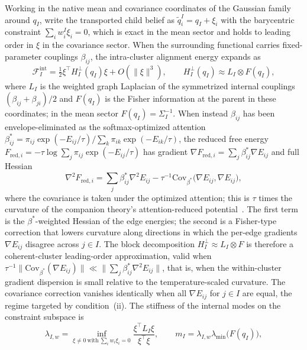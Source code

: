 \documentclass[11pt]{article}
\begin{document}
Working in the native mean and covariance coordinates of the Gaussian family around $q_I$, write the transported child belief as $\widetilde{q}_i^I = q_I + \xi_i$ with the barycentric constraint $\sum_i w_i^I \xi_i = 0$, which is exact in the mean sector and holds to leading order in $\xi$ in the covariance sector. When the surrounding functional carries fixed-parameter couplings $\beta_{ij}$, the intra-cluster alignment energy expands as
\begin{equation}
\mathcal{F}_I^{\mathrm{int}} = \tfrac{1}{2}\xi^\top H_I^\perp(q_I)\xi + O(\|\xi\|^3), \qquad H_I^\perp(q_I) \approx L_I \otimes F(q_I),
\label{eq:rg_internal_hessian}
\end{equation}
where $L_I$ is the weighted graph Laplacian of the symmetrized internal couplings $(\beta_{ij} + \beta_{ji})/2$ and $F(q_I)$ is the Fisher information at the parent in these coordinates; in the mean sector $F(q_I)=\Sigma_I^{-1}$. When instead $\beta_{ij}$ has been envelope-eliminated as the softmax-optimized attention $\beta^*_{ij} = \pi_{ij} \exp(-E_{ij}/\tau) / \sum_k \pi_{ik} \exp(-E_{ik}/\tau)$, the reduced free energy $F_{\mathrm{red},i} = -\tau \log \sum_j \pi_{ij} \exp(-E_{ij}/\tau)$ has gradient $\nabla F_{\mathrm{red},i} = \sum_j \beta^*_{ij} \nabla E_{ij}$ and full Hessian
\begin{equation}
\nabla^2 F_{\mathrm{red},i} = \sum_j \beta^*_{ij} \nabla^2 E_{ij} - \tau^{-1} \mathrm{Cov}_{\beta^*}\big(\nabla E_{ij}, \nabla E_{ij}\big),
\label{eq:rg_reduced_hessian}
\end{equation}
where the covariance is taken under the optimized attention; this is $\tau$ times the curvature of the companion theory's attention-reduced potential~\cite[Ch.~6]{DennisGaugeVFE2026}. The first term is the $\beta^*$-weighted Hessian of the edge energies; the second is a Fisher-type correction that lowers curvature along directions in which the per-edge gradients $\nabla E_{ij}$ disagree across $j \in I$. The block decomposition $H_I^\perp \approx L_I \otimes F$ is therefore a coherent-cluster leading-order approximation, valid when $\tau^{-1}\|\mathrm{Cov}_{\beta^*}(\nabla E_{ij})\| \ll \|\sum_j \beta^*_{ij} \nabla^2 E_{ij}\|$, that is, when the within-cluster gradient dispersion is small relative to the temperature-scaled curvature. The covariance correction vanishes identically when all $\nabla E_{ij}$ for $j \in I$ are equal, the regime targeted by condition~(ii). The stiffness of the internal modes on the constraint subspace is
\begin{equation}
\lambda_{I,w} = \inf_{\xi \neq 0\ \text{with}\ \sum_i w_i \xi_i = 0} \frac{\xi^\top L_I \xi}{\xi^\top \xi}, \qquad m_I = \lambda_{I,w}\lambda_{\min}\big(F(q_I)\big),
\label{eq:rg_constrained_gap}
\end{equation}
\end{document}
